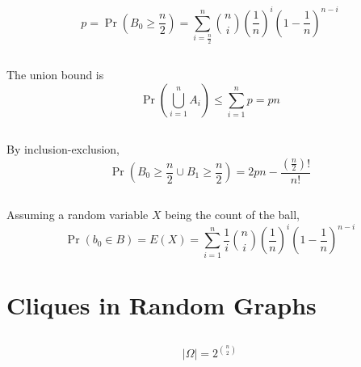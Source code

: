 \documentclass{article}
\begin{document}
\subsection{}

\begin{equation}
    p = \Pr\left(B_0 \geqslant \frac{n}{2}\right) = \sum_{i = \frac{n}{2}}^n \binom{n}{i} \left(\frac{1}{n}\right)^i \left(1 - \frac{1}{n}\right)^{n - i}
\end{equation}

\subsection{}

The union bound is
\begin{equation}
    \Pr\left(\bigcup_{i = 1}^{n} A_i\right) \leqslant \sum_{i = 1}^{n} p = pn
\end{equation}

\subsection{}

By inclusion-exclusion,
\begin{equation}
    \Pr\left(B_0 \geqslant \frac{n}{2} \cup B_1 \geqslant \frac{n}{2}\right) = 2pn - \frac{\left(\frac{n}{2}\right)!}{n!}
\end{equation}

\subsection{}

Assuming a random variable \(X\) being the count of the ball,
\begin{equation}
    \Pr(b_0 \in B) = E(X) = \sum_{i = 1}^n \frac{1}{i} \binom{n}{i} \left(\frac{1}{n}\right)^i \left(1 - \frac{1}{n}\right)^{n - i}
\end{equation}

\section{Cliques in Random Graphs}

\subsection{}

\begin{equation}
    |\Omega| = 2^{\binom{n}{2}}
\end{equation}
\end{document}
